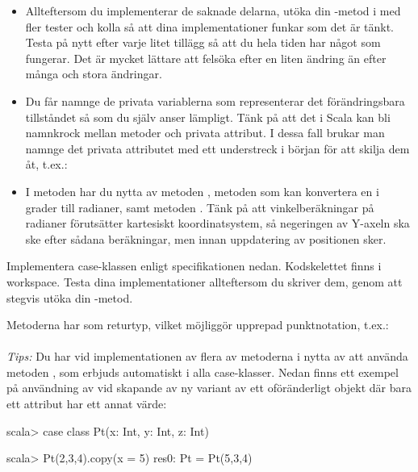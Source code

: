 \begin{itemize}
\item Allteftersom du implementerar de saknade delarna, utöka din -metod i  med fler tester och kolla så att dina implementationer funkar som det är tänkt. Testa på nytt efter varje litet tillägg så att du hela tiden har något som fungerar. Det är mycket lättare att felsöka efter en liten ändring än efter många och stora ändringar.

\item Du får namnge de privata variablerna som representerar det förändringsbara tillståndet så som du själv anser lämpligt. Tänk på att det i Scala kan bli namnkrock mellan metoder och privata attribut. I dessa fall brukar man namnge det privata attributet med ett understreck i början för att skilja dem åt, t.ex.: \\

\item I metoden  har du nytta av metoden , metoden  som kan konvertera en  i grader till radianer, samt metoden . Tänk på att vinkelberäkningar på radianer förutsätter kartesiskt koordinatsystem, så negeringen av Y-axeln ska ske efter sådana beräkningar, men innan uppdatering av positionen sker.
\end{itemize}


\Task Implementera case-klassen  enligt specifikationen nedan. Kodskelettet finns i workspace. Testa dina implementationer allteftersom du skriver dem, genom att stegvis utöka din -metod.


\noindent Metoderna har  som returtyp, vilket möjliggör upprepad punktnotation, t.ex.:\\
\\
\emph{Tips:} Du har vid implementationen av flera av metoderna i  nytta av att använda metoden , som erbjuds automatiskt i alla case-klasser. Nedan finns ett exempel på användning av  vid skapande av ny variant av ett oföränderligt objekt där bara ett attribut har ett annat värde:
\begin{REPLnonum}
scala> case class Pt(x: Int, y: Int, z: Int)

scala> Pt(2,3,4).copy(x = 5)
res0: Pt = Pt(5,3,4)
\end{REPLnonum}

